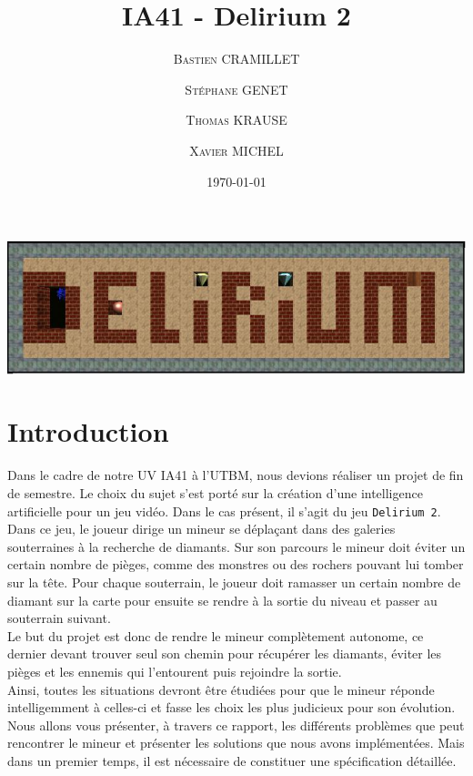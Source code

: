 \documentclass[a4paper,11pt]{article}
\title{IA41 - Delirium 2}
\author{
\textsc{Bastien CRAMILLET}
\and
\textsc{St\'ephane GENET}
\and
\textsc{Thomas KRAUSE}
\and
\textsc{Xavier MICHEL}
}
\date{\today}
\begin{document}
\maketitle
\begin{center}
	\includegraphics[width=16.5cm]{logo}
\end{center}
\thispagestyle{empty}

\newpage
{}%
\newpage



	\section{Introduction}
	
Dans le cadre de notre UV IA41 \`a l'UTBM, nous devions r\'ealiser un projet de fin de semestre. Le choix du sujet s'est port\'e sur la cr\'eation d'une intelligence artificielle pour un jeu vid\'eo. 
Dans le cas pr\'esent, il s'agit du jeu \texttt{Delirium 2}. Dans ce jeu, le joueur dirige un mineur se d\'epla\c cant dans des galeries souterraines \`a la recherche de diamants. Sur son parcours le mineur doit \'eviter un certain nombre de pi\`eges, comme des monstres ou des rochers pouvant lui tomber sur la t\^ete. Pour chaque souterrain, le joueur doit ramasser un certain nombre de diamant sur la carte pour ensuite se rendre \`a la sortie du niveau et passer au souterrain suivant.\\

Le but du projet est donc de rendre le mineur compl\`etement autonome, ce dernier devant trouver seul son chemin pour r\'ecup\'erer les diamants, \'eviter les pi\`eges et les ennemis qui l'entourent puis rejoindre la sortie.\\

Ainsi, toutes les situations devront \^etre \'etudi\'ees pour que le mineur r\'eponde intelligemment \`a celles-ci et fasse les choix les plus judicieux pour son \'evolution.\\

Nous allons vous pr\'esenter, \`a travers ce rapport, les diff\'erents probl\`emes que peut rencontrer le mineur et pr\'esenter les solutions que nous avons impl\'ement\'ees. Mais dans un premier temps, il est n\'ecessaire de constituer une sp\'ecification d\'etaill\'ee.
	
\end{document}
